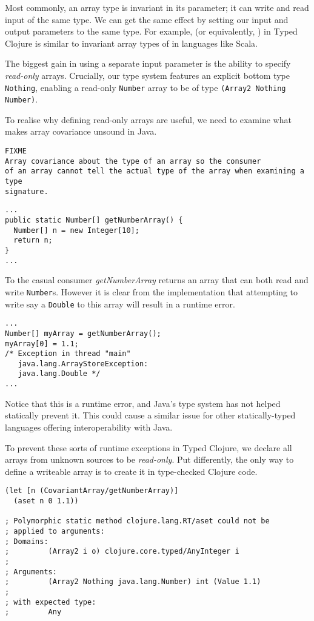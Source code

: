 Most commonly, an array type is invariant in its parameter; it can
write and read input of the same type.
We can get the same effect by setting our input and output
parameters to the same type. For example, {\ArrayTwo {\Number} {\Number}}
(or equivalently, {\Array {\Number}})
in Typed Clojure is similar to invariant array types of \Number in languages like Scala.

The biggest gain in using a separate input parameter is the ability
to specify \emph{read-only} arrays. Crucially, our type system features an
explicit bottom type \lstinline|Nothing|, enabling a read-only \lstinline|Number| array
to be of type \lstinline|(Array2 Nothing Number)|.

To realise why defining read-only arrays are useful, we need to examine
what makes array covariance unsound in Java.
\begin{verbatim}
FIXME
Array covariance about the type of an array so the consumer
of an array cannot tell the actual type of the array when examining a type
signature.
\end{verbatim}

\begin{lstlisting}
...
public static Number[] getNumberArray() {
  Number[] n = new Integer[10];
  return n;
}
...
\end{lstlisting}

To the casual consumer \emph{getNumberArray} returns an array that can both
read and write \lstinline|Number|s. However it is clear from the implementation
that attempting to write say a \lstinline|Double| to this array will result
in a runtime error.

\begin{verbatim}
...
Number[] myArray = getNumberArray();
myArray[0] = 1.1;
/* Exception in thread "main" 
   java.lang.ArrayStoreException: 
   java.lang.Double */
...
\end{verbatim}

Notice that this is a runtime error, and Java's type system has not helped
statically prevent it.
This could cause a similar issue for other statically-typed languages offering
interoperability with Java. 

To prevent these sorts of runtime exceptions in Typed Clojure, we declare
all arrays from unknown sources to be \emph{read-only}. Put differently,
the only way to define a writeable array is to create it in type-checked Clojure
code.

\begin{lstlisting}
(let [n (CovariantArray/getNumberArray)]
  (aset n 0 1.1))

; Polymorphic static method clojure.lang.RT/aset could not be 
; applied to arguments:
; Domains: 
;         (Array2 i o) clojure.core.typed/AnyInteger i
; 
; Arguments:
;         (Array2 Nothing java.lang.Number) int (Value 1.1)
; 
; with expected type:
;         Any
\end{lstlisting}

